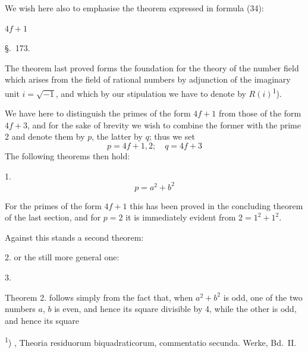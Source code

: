 
We wish here also to emphasise the theorem expressed in
formula (34):

 $4f+1$ 

\begin{center}
\S.~173.\\[6pt]
\end{center}

The theorem last proved forms the foundation for the
theory of the number field which arises from the field of rational
numbers by adjunction of the imaginary
unit $i=\sqrt{-1}$, and which by our stipulation we have to denote
by $R(i)$\textsuperscript{1}).

We have here to distinguish the primes of the form $4f+1$
from those of the form $4f+3$, and for the sake of brevity we
wish to combine the former with the prime 2 and denote them
by $p$, the latter by $q$; thus we set
\[
p=4f+1,2;\quad q=4f+3
\]
The following theorems then hold:

1. 
\[
p=a^2+b^2
\]

For the primes of the form $4f+1$ this has been proved in the
concluding theorem of the last section, and for $p=2$ it is
immediately evident from $2=1^2+1^2$.

Against this stands a second theorem:

2.  or the still more general one:

3. 

Theorem 2. follows simply from the fact that, when $a^2+b^2$
is odd, one of the two numbers $a$, $b$ is even, and hence its
square divisible by 4, while the other is odd, and hence its square

\textsuperscript{1}) , Theoria residuorum biquadraticorum, commentatio
secunda. Werke, Bd.~II.
